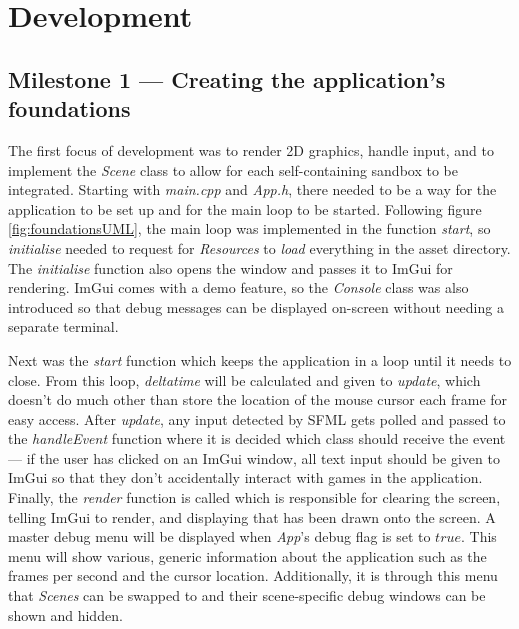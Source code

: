 \documentclass[11pt, a4paper]{report}
\begin{document}
\section{Development}
\label{sec:development}

\subsection[Creating the application's foundations]{Milestone 1 --- Creating the application's foundations}
\label{subsec:creatingTheFoundations}

The first focus of development was to render 2D graphics, handle input, and to implement the \emph{Scene} class to allow for each self-containing sandbox to be integrated. Starting with \emph{main.cpp} and \emph{App.h}, there needed to be a way for the application to be set up and for the main loop to be started. Following figure \ref{fig:foundationsUML}, the main loop was implemented in the function \emph{start}, so \emph{initialise} needed to request for \emph{Resources} to \emph{load} everything in the asset directory. The \emph{initialise} function also opens the window and passes it to ImGui for rendering. ImGui comes with a demo feature, so the \emph{Console} class was also introduced so that debug messages can be displayed on-screen without needing a separate terminal.

Next was the \emph{start} function which keeps the application in a loop until it needs to close. From this loop, \emph{deltatime} will be calculated and given to \emph{update}, which doesn't do much other than store the location of the mouse cursor each frame for easy access. After \emph{update}, any input detected by SFML gets polled and passed to the \emph{handleEvent} function where it is decided which class should receive the event --- if the user has clicked on an ImGui window, all text input should be given to ImGui so that they don't accidentally interact with games in the application. Finally, the \emph{render} function is called which is responsible for clearing the screen, telling ImGui to render, and displaying that has been drawn onto the screen. A master debug menu will be displayed when \emph{App}'s debug flag is set to $true$. This menu will show various, generic information about the application such as the frames per second and the cursor location. Additionally, it is through this menu that \emph{Scenes} can be swapped to and their scene-specific debug windows can be shown and hidden.
\end{document}
